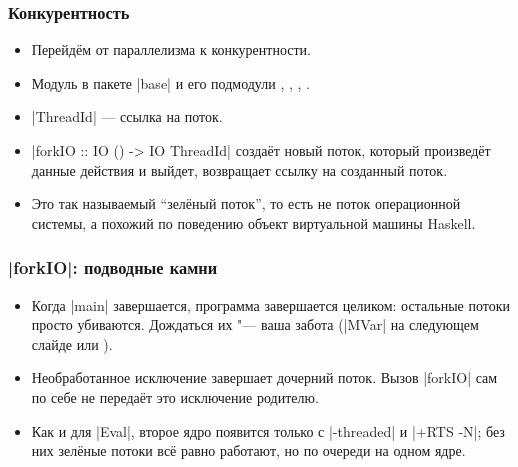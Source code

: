 \documentclass[11pt]{beamer}
\begin{document}
\begin{frame}[fragile]
  \frametitle{Конкурентность}
  \begin{itemize}
    \item Перейдём от параллелизма к конкурентности.
    \item Модуль \href{https://hackage.haskell.org/package/base/docs/Control-Concurrent.html}{} в пакете \haskinline|base| и его подмодули \href{https://hackage.haskell.org/package/base/docs/Control-Concurrent-MVar.html}{}, \href{https://hackage.haskell.org/package/base/docs/Control-Concurrent-Chan.html}{}, \href{https://hackage.haskell.org/package/base/docs/Control-Concurrent-QSem.html}{}, \href{https://hackage.haskell.org/package/base/docs/Control-Concurrent-QSemN.html}{}.
    \item \haskinline|ThreadId| --- ссылка на поток.
    \item \haskinline|forkIO :: IO () -> IO ThreadId| создаёт новый поток, который произведёт данные действия и выйдет, возвращает ссылку на созданный поток.
          \pause
    \item Это так называемый \enquote{зелёный поток}, то есть не поток операционной системы, а похожий по поведению объект виртуальной машины Haskell.
  \end{itemize}
\end{frame}

\begin{frame}[fragile]
  \frametitle{\haskinline|forkIO|: подводные камни}
  \begin{itemize}
    \item Когда \haskinline|main| завершается, программа завершается целиком: остальные потоки просто убиваются. Дождаться их "--- ваша забота (\haskinline|MVar| на следующем слайде или ).
    \item Необработанное исключение завершает дочерний поток. Вызов \haskinline|forkIO| сам по себе не передаёт это исключение родителю.
    \item Как и для \haskinline|Eval|, второе ядро появится только с \ghcinline|-threaded| и \ghcinline|+RTS -N|; без них зелёные потоки всё равно работают, но по очереди на одном ядре.
  \end{itemize}
\end{frame}
\end{document}
